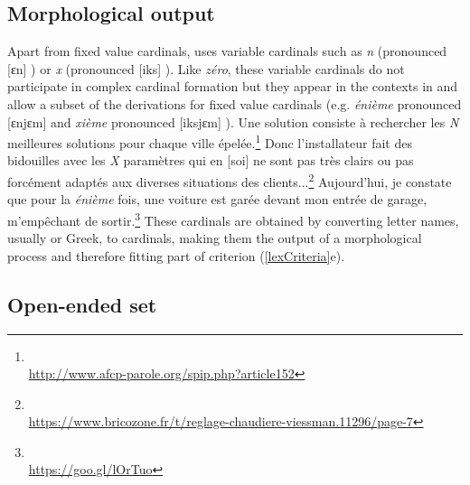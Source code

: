 \documentclass[output=paper]{langsci/langscibook}
\begin{document}
\subsection{\textbf{Morphological output}}

Apart from fixed value cardinals,  uses variable cardinals  such as \emph{n}  (pronounced [ɛn] %
) or  \emph{x}  (pronounced [iks] %
). Like \emph{zéro}, these variable cardinals  do not participate in complex cardinal formation but they appear in the contexts in  and allow a subset of the derivations for fixed value cardinals  (e.g. \emph{énième}  pronounced [ɛnjɛm] %
 and \emph{xième}  pronounced  [iksjɛm] %
).
\ea\label{lettreCardinals}
	\ea Une solution consiste à rechercher les \emph{N} meilleures solutions pour chaque ville épelée.\footnote{\\\url{http://www.afcp-parole.org/spip.php?article152}}
	\ex Donc l'installateur fait des bidouilles avec les \emph{X} paramètres qui en [soi] ne sont pas très clairs ou pas forcément adaptés aux diverses situations des clients...\footnote{\\\url{https://www.bricozone.fr/t/reglage-chaudiere-viessman.11296/page-7}} 	
	\ex Aujourd'hui, je constate que pour la \emph{énième} fois, une voiture est garée devant mon entrée de garage, m'empêchant de sortir.\footnote{\\\url{https://goo.gl/lOrTuo}}
	\z
\z
These cardinals  are obtained by converting letter names, usually  or Greek, to cardinals, making them the output of a morphological process and therefore fitting part of criterion (\ref{lexCriteria}e).

\subsection{\textbf{Open-ended set}}
\end{document}
